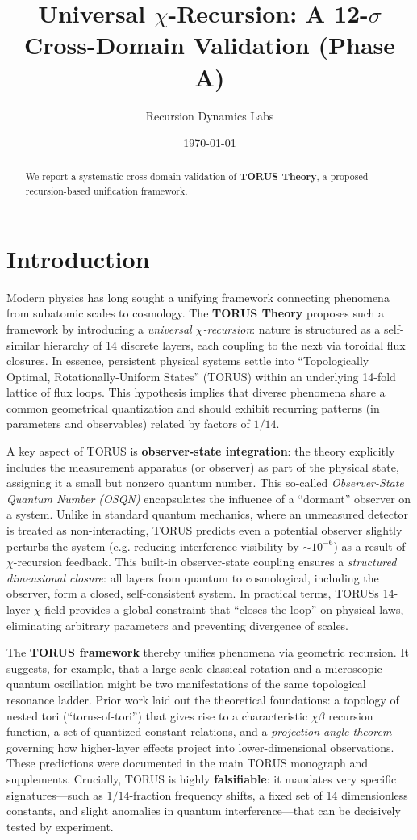 \documentclass{article}
\title{Universal $\chi$-Recursion: A 12-$\sigma$ Cross-Domain Validation (Phase A)}
\author{Recursion Dynamics Labs}
\date{\today}
\begin{document}
\maketitle
\begin{abstract}
We report a systematic cross-domain validation of \textbf{TORUS Theory}, a proposed recursion-based unification framework.
\end{abstract}

\section{Introduction}\label{sec:intro}
Modern physics has long sought a unifying framework connecting phenomena from subatomic scales to cosmology. The \textbf{TORUS Theory} proposes such a framework by introducing a \emph{universal $\chi$-recursion}: nature is structured as a self-similar hierarchy of 14 discrete layers, each coupling to the next via toroidal flux closures. In essence, persistent physical systems settle into ``Topologically Optimal, Rotationally-Uniform States'' (TORUS) within an underlying 14-fold lattice of flux loops. This hypothesis implies that diverse phenomena share a common geometrical quantization and should exhibit recurring patterns (in parameters and observables) related by factors of $1/14$.

A key aspect of TORUS is \textbf{observer-state integration}: the theory explicitly includes the measurement apparatus (or observer) as part of the physical state, assigning it a small but nonzero quantum number. This so-called \emph{Observer-State Quantum Number (OSQN)} encapsulates the influence of a ``dormant'' observer on a system. Unlike in standard quantum mechanics, where an unmeasured detector is treated as non-interacting, TORUS predicts even a potential observer slightly perturbs the system (e.g. reducing interference visibility by $\sim 10^{-6}$) as a result of $\chi$-recursion feedback. This built-in observer-state coupling ensures a \emph{structured dimensional closure}: all layers from quantum to cosmological, including the observer, form a closed, self-consistent system. In practical terms, TORUSs 14-layer $\chi$-field provides a global constraint that ``closes the loop'' on physical laws, eliminating arbitrary parameters and preventing divergence of scales. 

The \textbf{TORUS framework} thereby unifies phenomena via geometric recursion. It suggests, for example, that a large-scale classical rotation and a microscopic quantum oscillation might be two manifestations of the same topological resonance ladder. Prior work laid out the theoretical foundations: a topology of nested tori (``torus-of-tori'') that gives rise to a characteristic $\chi$$\beta$ recursion function, a set of quantized constant relations, and a \emph{projection-angle theorem} governing how higher-layer effects project into lower-dimensional observations. These predictions were documented in the main TORUS monograph and supplements. Crucially, TORUS is highly \textbf{falsifiable}: it mandates very specific signatures—such as $1/14$-fraction frequency shifts, a fixed set of 14 dimensionless constants, and slight anomalies in quantum interference—that can be decisively tested by experiment. 
\end{document}
